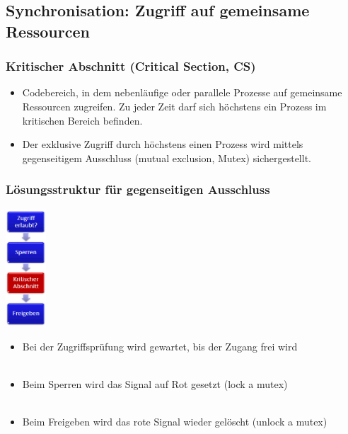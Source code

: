 \subsection{Synchronisation: Zugriff auf gemeinsame Ressourcen}
\subsubsection{Kritischer Abschnitt (Critical Section, CS)}
\begin{itemize}
  \item Codebereich, in dem nebenläufige oder parallele Prozesse auf gemeinsame Ressourcen zugreifen. Zu jeder Zeit darf sich höchstens ein Prozess im kritischen Bereich
        befinden.
  \item Der exklusive Zugriff durch höchstens einen Prozess wird mittels gegenseitigem Ausschluss (mutual exclusion, Mutex) sichergestellt.
\end{itemize}

\subsubsection{Lösungsstruktur für gegenseitigen Ausschluss}
\begin{minipage}[c]{2cm}
  \includegraphics[width=1.5cm]{images/Concurrency/Loesungsstruktur.png}
\end{minipage}
\begin{minipage}[c]{14cm}
  \begin{itemize}
    \item Bei der Zugriffsprüfung wird gewartet, bis der Zugang frei wird \\ \ \\
    \item Beim Sperren wird das Signal auf Rot gesetzt (lock a mutex) \\ \ \\
    \item Beim Freigeben wird das rote Signal wieder gelöscht (unlock a mutex)
  \end{itemize}
\end{minipage}


